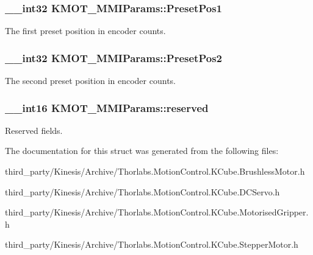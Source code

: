 \subsubsection[{\texorpdfstring{Preset\+Pos1}{PresetPos1}}]{\setlength{\rightskip}{0pt plus 5cm}\+\_\+\+\_\+int32 K\+M\+O\+T\+\_\+\+M\+M\+I\+Params\+::\+Preset\+Pos1}\hypertarget{struct_k_m_o_t___m_m_i_params_a8ebcf6fd7bc7880ba193cabcdb8636da}{}\label{struct_k_m_o_t___m_m_i_params_a8ebcf6fd7bc7880ba193cabcdb8636da}


The first preset position in encoder counts. 

\subsubsection[{\texorpdfstring{Preset\+Pos2}{PresetPos2}}]{\setlength{\rightskip}{0pt plus 5cm}\+\_\+\+\_\+int32 K\+M\+O\+T\+\_\+\+M\+M\+I\+Params\+::\+Preset\+Pos2}\hypertarget{struct_k_m_o_t___m_m_i_params_a139331b9055b97f98f1de1c64f2f4fa2}{}\label{struct_k_m_o_t___m_m_i_params_a139331b9055b97f98f1de1c64f2f4fa2}


The second preset position in encoder counts. 

\subsubsection[{\texorpdfstring{reserved}{reserved}}]{\setlength{\rightskip}{0pt plus 5cm}\+\_\+\+\_\+int16 K\+M\+O\+T\+\_\+\+M\+M\+I\+Params\+::reserved}\hypertarget{struct_k_m_o_t___m_m_i_params_ada3a9e96b94f041b47292e6e355cdcc2}{}\label{struct_k_m_o_t___m_m_i_params_ada3a9e96b94f041b47292e6e355cdcc2}


Reserved fields. 



The documentation for this struct was generated from the following files\+:\begin{DoxyCompactItemize}
\item 
third\+\_\+party/\+Kinesis/\+Archive/Thorlabs.\+Motion\+Control.\+K\+Cube.\+Brushless\+Motor.\+h\item 
third\+\_\+party/\+Kinesis/\+Archive/Thorlabs.\+Motion\+Control.\+K\+Cube.\+D\+C\+Servo.\+h\item 
third\+\_\+party/\+Kinesis/\+Archive/Thorlabs.\+Motion\+Control.\+K\+Cube.\+Motorised\+Gripper.\+h\item 
third\+\_\+party/\+Kinesis/\+Archive/Thorlabs.\+Motion\+Control.\+K\+Cube.\+Stepper\+Motor.\+h\end{DoxyCompactItemize}

